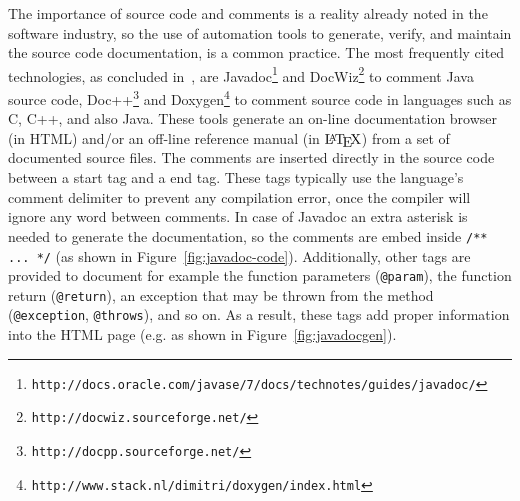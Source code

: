 The importance of source code and comments is a reality already noted in the software industry, so the use of automation tools to generate, verify, and maintain the source code documentation, is a common practice. The most frequently cited technologies, as concluded in~\citep{forward2002relevance}, are Javadoc\footnote{\texttt{http://docs.oracle.com/javase/7/docs/technotes/guides/javadoc/}} and DocWiz\footnote{\texttt{http://docwiz.sourceforge.net/}} to comment Java source code, Doc++\footnote{\texttt{http://docpp.sourceforge.net/}} and Doxygen\footnote{\texttt{http://www.stack.nl/dimitri/doxygen/index.html}} to comment source code in languages such as C, C++, and also Java. These tools generate an on-line documentation browser (in HTML) and/or an off-line reference manual (in $\mbox{\LaTeX}$) from a set of documented source files. The comments are inserted directly in the source code between a start tag and a end tag. These tags typically use the language's comment delimiter to prevent any compilation error, once the compiler will ignore any word between comments. In case of Javadoc an extra asterisk is needed to generate the documentation, so the comments are embed inside \texttt{/** ... */} (as shown in Figure~\ref{fig:javadoc-code}). Additionally, other tags are provided to document for example the function parameters (\texttt{@param}), the function return (\texttt{@return}), an exception that may be thrown from the method (\texttt{@exception}, \texttt{@throws}), and so on. As a result, these tags add proper information into the HTML page (e.g. as shown in Figure~\ref{fig:javadocgen}).

